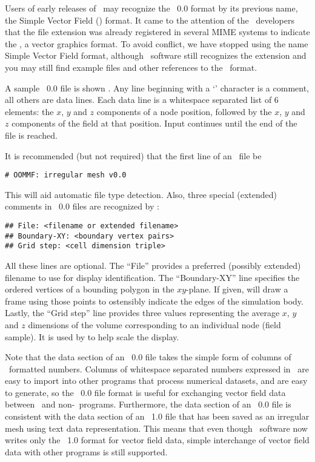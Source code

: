 Users of early releases of \OOMMF\ may recognize the \OVF\ 0.0 format
by its previous name, the Simple Vector Field (\SVF)
format.  It came to the attention of the \OOMMF\ developers that the
file extension  was already registered in several MIME systems
to indicate the
,
a vector graphics format.  To avoid conflict, we have stopped using
the name Simple Vector Field format, although \OOMMF\ software still
recognizes the  extension and you may still find example
files and other references to the \SVF\ format.

A sample \OVF\ 0.0 file is shown .  Any line beginning with a `\lb' character is
a comment, all others are data lines.  Each data line is a whitespace
separated list of 6 elements: the $x$, $y$ and $z$ components of a
node position, followed by the $x$, $y$ and $z$ components of the
field at that position.  Input continues until the end of the file is
reached.

It is recommended (but not required) that the first line of an \OVF\
file be
\begin{verbatim}
# OOMMF: irregular mesh v0.0
\end{verbatim}
This will aid automatic file type detection.  Also, three special
(extended) comments in \OVF\ 0.0 files are recognized by :
\begin{verbatim}
## File: <filename or extended filename>
## Boundary-XY: <boundary vertex pairs>
## Grid step: <cell dimension triple>
\end{verbatim}
All these lines are optional.  The ``File'' provides a preferred
(possibly extended) filename to use for display identification.  The
``Boundary-XY'' line specifies the ordered vertices of a bounding
polygon in the $xy$-plane.  If given, \app{mmDisp} will draw a frame
using those points to ostensibly indicate the edges of the simulation
body.  Lastly, the ``Grid step'' line provides three values
representing the average $x$, $y$ and $z$ dimensions of the volume
corresponding to an individual node (field sample).  It is used by
\app{mmDisp} to help scale the display.

Note that the data section of an \OVF\ 0.0 file takes the simple
form of columns of \ASCII\ formatted numbers.  Columns of whitespace
separated numbers expressed in \ASCII\ are easy to import
into other programs that process numerical datasets, and
are easy to generate, so the \OVF\ 0.0 file format is useful for
exchanging vector field data between \OOMMF\ and non-\OOMMF\ programs.
Furthermore, the data section of an \OVF\ 0.0 file is consistent
with the data section of an \OVF\ 1.0 file that has been saved
as an irregular mesh using text data representation.  This means that
even though \OOMMF\ software now writes only the \OVF\ 1.0 format
for vector field data, simple interchange of vector field data
with other programs is still supported.

